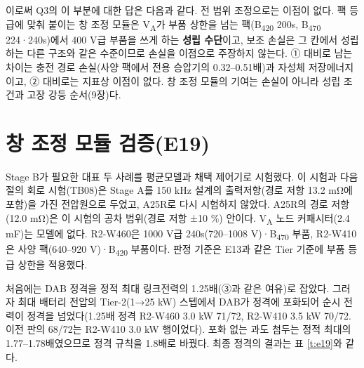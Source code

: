 이로써 Q3의 이 부분에 대한 답은 다음과 같다. 전 범위 조정으로는 이점이 없다. 팩 등급에 맞춰 붙이는 창 조정 모듈은 V\textsubscript{A}가 부품 상한을 넘는 팩(B\textsubscript{420} 200s, B\textsubscript{470} 224·240s)에서 400 V급 부품을 쓰게 하는 \textbf{성립 수단}이고, 보조 손실은 그 칸에서 성립하는 다른 구조와 같은 수준이므로 손실을 이점으로 주장하지 않는다. ① 대비로 남는 차이는 충전 경로 손실(사양 팩에서 전용 승압기의 0.32–0.51배)과 자성체 저장에너지이고, ② 대비로는 지표상 이점이 없다. 창 조정 모듈의 기여는 손실이 아니라 성립 조건과 고장 강등 순서(9장)다.

\section{창 조정 모듈 검증(E19)}

Stage B가 필요한 대표 두 사례를 평균모델과 채택 제어기로 시험했다. 이 시험과 다음 절의 회로 시험(TB08)은 Stage A를 150 kHz 설계의 출력저항(경로 저항 13.2 mΩ에 포함)을 가진 전압원으로 두었고, A25R로 다시 시험하지 않았다. A25R의 경로 저항(12.0 mΩ)은 이 시험의 공차 범위(경로 저항 ±10 \%) 안이다. V\textsubscript{A} 노드 커패시터(2.4 mF)는 모델에 없다. R2-W460은 1000 V급 240s(720–1008 V)·B\textsubscript{470} 부품, R2-W410은 사양 팩(640–920 V)·B\textsubscript{420} 부품이다. 판정 기준은 E13과 같은 Tier 기준에 부품 등급 상한을 적용했다.

처음에는 DAB 정격을 정적 최대 링크전력의 1.25배(③과 같은 여유)로 잡았다. 그러자 최대 배터리 전압의 Tier-2(1→25 kW) 스텝에서 DAB가 정격에 포화되어 순시 전력이 정격을 넘었다(1.25배 정격 R2-W460 3.0 kW 71/72, R2-W410 3.5 kW 70/72. 이전 판의 68/72는 R2-W410 3.0 kW 행이었다). 포화 없는 과도 첨두는 정적 최대의 1.77–1.78배였으므로 정격 규칙을 1.8배로 바꿨다. 최종 정격의 결과는 표 \ref{t:e19}와 같다.

